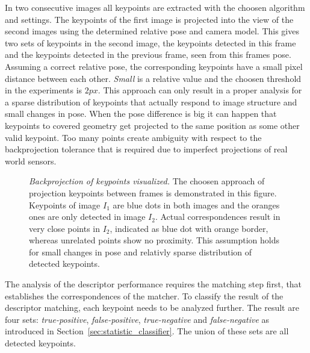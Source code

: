 In two consecutive images all keypoints are extracted with the choosen algorithm and settings.
The keypoints of the first image is projected into the view of the second images using the determined relative pose and camera model.
This gives two sets of keypoints in the second image, the keypoints detected in this frame and the keypoints detected in the previous frame, seen from this frames pose.
Assuming a correct relative pose, the corresponding keypoints have a small pixel distance between each other.
\emph{Small} is a relative value and the choosen threshold in the experiments is $2px$.
This approach can only result in a proper analysis for a sparse distribution of keypoints that actually respond to image structure and small changes in pose.
When the pose difference is big it can happen that keypoints to covered geometry get projected to the same position as some other valid keypoint.
Too many points create ambiguity with respect to the backprojection tolerance that is required due to imperfect projections of real world sensors.
\begin{figure}[H]
    
    \caption[Backprojection of keypoints visualized]{\emph{Backprojection of keypoints visualized.} The choosen approach of projection keypoints between frames is demonstrated in this figure. Keypoints of image $I_1$ are blue dots in both images and the oranges ones are only detected in image $I_2$. Actual correspondences result in very close points in $I_2$, indicated as blue dot with orange border, whereas unrelated points show no proximity. This assumption holds for small changes in pose and relativly sparse distribution of detected keypoints.}
\end{figure}
The analysis of the descriptor performance requires the matching step first, that establishes the correspondences of the matcher.
To classify the result of the descriptor matching, each keypoint needs to be analyzed further.
The result are four sets: \emph{true-positive}, \emph{false-positive}, \emph{true-negative} and \emph{false-negative} as introduced in Section~\ref{sec:statistic_classifier}.
The union of these sets are all detected keypoints.

